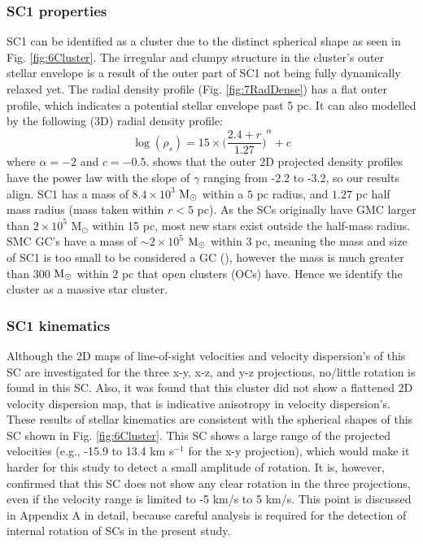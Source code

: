 \documentclass[fleqn,usenatbib]{mnras}
\begin{document}
\subsubsection{SC1 properties}

SC1 can be identified as a cluster due to the distinct spherical shape as seen in Fig. \ref{fig:6Cluster}. The irregular and clumpy structure in the cluster's outer stellar envelope is a result of the outer part of SC1 not being fully dynamically relaxed yet. The radial density profile (Fig. \ref{fig:7RadDense}) has a flat outer profile, which indicates a potential stellar envelope past 5 pc. It can also modelled by the following (3D) radial density profile:
\begin{equation}
    \log(\rho_{s})=15\times{\Big(\frac{2.4+r}{1.27}\Big)}^{\alpha}+c
\end{equation}
where $\alpha=-2$ and $c=-0.5$. \cite{K31Elson_Fall_Freeman1987} shows that the outer 2D projected density profiles have the power law with the slope of $\gamma$ ranging from -2.2 to -3.2, so our results align. SC1 has a mass of $8.4\times 10^3$ ${\rm M}_{\odot}$ within a $5$ pc radius, and $1.27$ pc half mass radius (mass taken within $r<5$ pc). As the SCs originally have GMC larger than $2\times 10^5$ M$_\odot$ within 15 pc, most new stars exist outside the half-mass radius. 
SMC GC's have a mass of ${\sim}2\times 10^5$ ${\rm M}_{\odot}$ within $3$ pc, meaning the mass and size of SC1 is too small to be considered a GC (\citealt{85Hill_Zaritsky2006}), however the mass is much greater than $300$ ${\rm M}_{\odot}$ within $2$ pc that open clusters (OCs) have.
Hence we identify the cluster as a massive star cluster. 

\subsubsection{SC1 kinematics}
Although the 2D maps of line-of-sight velocities and velocity dispersion's of this SC are investigated for the three x-y, x-z, and y-z projections, no/little rotation is found in this SC. Also, it was found that this cluster did not show a flattened 2D velocity dispersion map, that is indicative anisotropy in velocity dispersion's. These results of stellar kinematics
are consistent with the spherical shapes of this SC shown in Fig. \ref{fig:6Cluster}. This SC shows a large range of the projected velocities (e.g., -15.9 to 13.4 km s$^{-1}$ for the x-y projection), which would make it harder for this study to detect a small amplitude of rotation. It is, however, confirmed that this SC does not show any clear rotation in the three projections, even if the velocity range is limited to -5 km/s to 5 km/s. This point is discussed in Appendix A in detail, because careful analysis is required for the detection of internal rotation of SCs in the present study.
\end{document}
